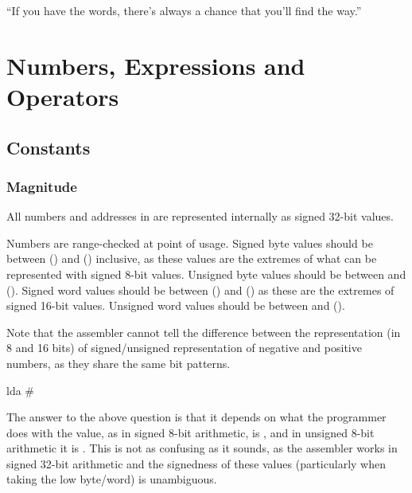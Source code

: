 \begin{savequote}
\sffamily
``If you have the words, there's always a chance that you'll find the way.''
\end{savequote}

\chapter{Numbers, Expressions and Operators}

\section{Constants}
\label{section:numberformat}

\label{changelog:20200905range}
\subsection{Magnitude}
All numbers and addresses in \dasm are represented internally as signed 32-bit values.

Numbers are range-checked at point of usage. Signed byte values should be between  () and  () inclusive, as these values are the extremes of what can be represented with signed 8-bit values. Unsigned byte values should be between  and  (). Signed  word values should be between  () and  () as these are the extremes of signed 16-bit values. Unsigned word values should be between  and  ().

Note that the assembler cannot tell the difference between the representation (in 8 and 16 bits) of signed/unsigned representation of negative and positive numbers, as they share the same bit patterns. 

\begin{code}
 lda #%
\end{code}

The answer to the above question is that it depends on what the programmer does with the value, as in signed 8-bit arithmetic,  is , and in unsigned 8-bit arithmetic it is . This is not as confusing as it sounds, as the assembler works in signed 32-bit arithmetic and the signedness of these values (particularly when taking the low byte/word) is unambiguous.

